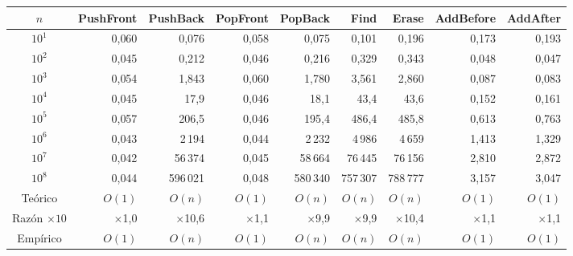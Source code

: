 \begin{tabular}{crrrrrrrr}
\toprule
$n$ & \textbf{PushFront} & \textbf{PushBack} & \textbf{PopFront} & \textbf{PopBack} & \textbf{Find} & \textbf{Erase} & \textbf{AddBefore} & \textbf{AddAfter} \\
\midrule
$10^{1}$ & 0{,}060 & 0{,}076 & 0{,}058 & 0{,}075 & 0{,}101 & 0{,}196 & 0{,}173 & 0{,}193 \\
$10^{2}$ & 0{,}045 & 0{,}212 & 0{,}046 & 0{,}216 & 0{,}329 & 0{,}343 & 0{,}048 & 0{,}047 \\
$10^{3}$ & 0{,}054 & 1{,}843 & 0{,}060 & 1{,}780 & 3{,}561 & 2{,}860 & 0{,}087 & 0{,}083 \\
$10^{4}$ & 0{,}045 & 17{,}9 & 0{,}046 & 18{,}1 & 43{,}4 & 43{,}6 & 0{,}152 & 0{,}161 \\
$10^{5}$ & 0{,}057 & 206{,}5 & 0{,}046 & 195{,}4 & 486{,}4 & 485{,}8 & 0{,}613 & 0{,}763 \\
$10^{6}$ & 0{,}043 & 2\,194 & 0{,}044 & 2\,232 & 4\,986 & 4\,659 & 1{,}413 & 1{,}329 \\
$10^{7}$ & 0{,}042 & 56\,374 & 0{,}045 & 58\,664 & 76\,445 & 76\,156 & 2{,}810 & 2{,}872 \\
$10^{8}$ & 0{,}044 & 596\,021 & 0{,}048 & 580\,340 & 757\,307 & 788\,777 & 3{,}157 & 3{,}047 \\
\midrule
Teórico & $O(1)$ & $O(n)$ & $O(1)$ & $O(n)$ & $O(n)$ & $O(n)$ & $O(1)$ & $O(1)$ \\
Razón $\times 10$ & $\times$1{,}0 & $\times$10{,}6 & $\times$1{,}1 & $\times$9{,}9 & $\times$9{,}9 & $\times$10{,}4 & $\times$1{,}1 & $\times$1{,}1 \\
Empírico & $O(1)$ & $O(n)$ & $O(1)$ & $O(n)$ & $O(n)$ & $O(n)$ & $O(1)$ & $O(1)$ \\
\bottomrule
\end{tabular}
